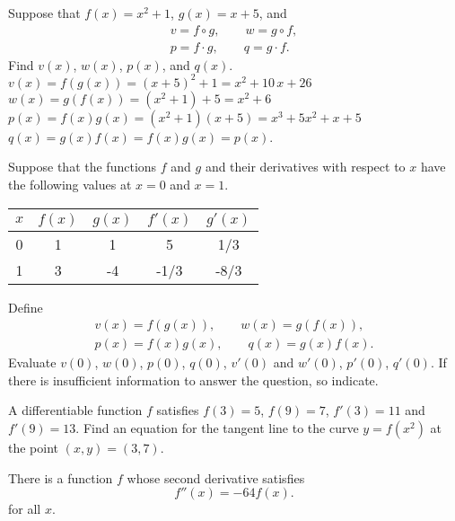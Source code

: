\begin{multicols}{2}
\problem Suppose that $f(x)=x^2+1$, $g(x)=x+5$, and 
\begin{gather*}
v = f\circ g, \qquad w=g\circ f, \\
p= f\cdot g,\qquad q=g\cdot f.
\end{gather*}
Find $v(x)$, $w(x)$, $p(x)$, and $q(x)$.
\answer 
$v(x) = f(g(x)) = (x+5)^2+1 = x^2+10\,x+26$ \\
$w(x)=g(f(x)) = (x^2+1)+5 = x^2+6$\\
$p(x)= f(x)g(x) = (x^2+1)(x+5) = x^3+5x^2+x+5$\\
$q(x) = g(x)f(x) = f(x)g(x) = p(x)$.
\endanswer








\problem \groupproblem  Suppose that the functions $f$ and $g$ and 
their derivatives with respect to $x$ have the following values at
$x=0$ and $x=1$.




\begin{center}
  \begin{tabular}{ccccc}
    \toprule
    $x$ & $f(x)$ & $g(x)$ & $f'(x)$ & $g'(x)$ \\ \midrule
    0   &   1    &   1    &   5   & 1/3   \\  
    1   &   3    &  -4    &  -1/3 & -8/3   \\
    \bottomrule
  \end{tabular}
\end{center}
Define
\begin{gather*}
  v(x) = f(g(x)), \qquad w(x) = g(f(x)), \\
  p(x)= f(x)g(x),\qquad q(x)=g(x)f(x).
\end{gather*}
Evaluate $v(0)$, $w(0)$, $p(0)$, $q(0)$, $v'(0)$ and $w'(0)$,
$p'(0)$, $q'(0)$.  If there is insufficient information to answer
the question, so indicate.








\problem  A differentiable function $f$ satisfies $f(3)=5$, $f(9)=7$, 
$f'(3)=11$ and $f'(9)=13$.  Find an equation for the tangent line
to the curve $y=f(x^2)$ at the point $(x,y)=(3,7)$.








\problem There is a function $f$ whose second derivative satisfies 
\begin{equation}
  f''(x) = -64 f(x).\tag{\dag}
\end{equation}
for all $x$.





\end{multicols}
